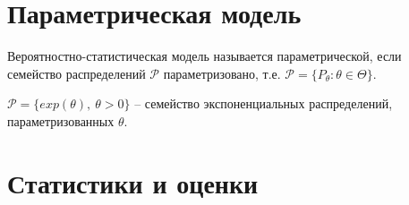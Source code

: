 \section{Параметрическая модель}
\begin{definition}
Вероятностно-статистическая модель называется параметрической, если семейство распределений $\displaystyle \mathcal{P}$ параметризовано, т.е. $\displaystyle \mathcal{P} =\{P_{\theta } :\theta \in \Theta \}$.
\end{definition}
\begin{example}
$\displaystyle \mathcal{P} =\{exp( \theta ),\ \theta  >0\}$ -- семейство экспоненциальных распределений, параметризованных $\displaystyle \theta $.
\end{example}
\section{Статистики и оценки}

